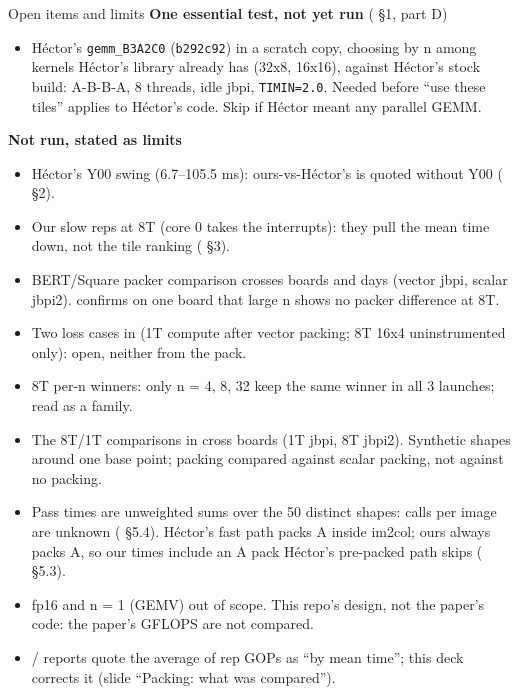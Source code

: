 \begin{frame}{Open items and limits}
\scriptsize
\textbf{One essential test, not yet run} ( \S1,  part D)
\begin{itemize}
\item H\'ector's \texttt{gemm\_B3A2C0} (\texttt{b292c92}) in a scratch copy, choosing by n among kernels H\'ector's library already has (32x8, 16x16), against H\'ector's stock build: A-B-B-A, 8 threads, idle jbpi, \texttt{TIMIN=2.0}. Needed before ``use these tiles'' applies to H\'ector's code. Skip if H\'ector meant any parallel GEMM.
\end{itemize}
\textbf{Not run, stated as limits}
\begin{itemize}\setlength\itemsep{1pt}
\item H\'ector's Y00 swing (6.7--105.5 ms): ours-vs-H\'ector's is quoted without Y00 ( \S2).
\item Our slow reps at 8T (core 0 takes the interrupts): they pull the mean time down, not the tile ranking ( \S3).
\item BERT/Square packer comparison crosses boards and days (vector jbpi, scalar jbpi2).  confirms on one board that large n shows no packer difference at 8T.
\item Two loss cases in  (1T compute after vector packing; 8T 16x4 uninstrumented only): open, neither from the pack.
\item 8T per-n winners: only n = 4, 8, 32 keep the same winner in all 3 launches; read as a family.
\item The 8T/1T comparisons in  cross boards (1T jbpi, 8T jbpi2). Synthetic  shapes around one base point; packing compared against scalar packing, not against no packing.
\item Pass times are unweighted sums over the 50 distinct shapes: calls per image are unknown ( \S5.4). H\'ector's fast path packs A inside im2col; ours always packs A, so our times include an A pack H\'ector's pre-packed path skips ( \S5.3).
\item fp16 and n = 1 (GEMV) out of scope. This repo's design, not the paper's code: the paper's GFLOPS are not compared.
\item {}/ reports quote the average of rep GOPs as ``by mean time''; this deck corrects it (slide ``Packing: what was compared'').
\end{itemize}
\end{frame}
